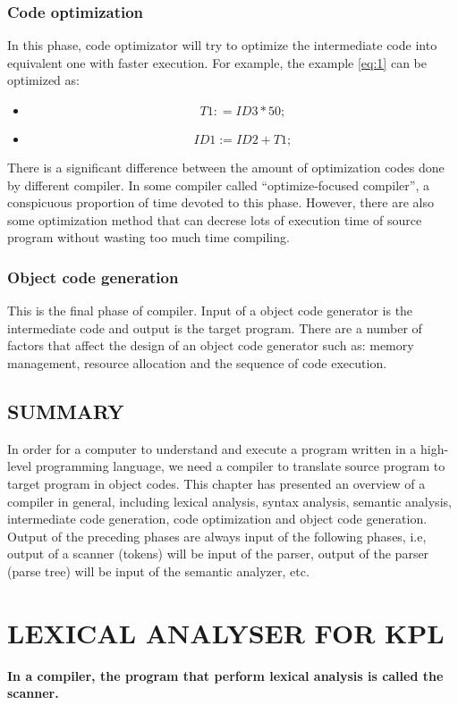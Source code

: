 \documentclass[12pt, a4paper]{report}
\begin{document}
			\subsection{Code optimization}
				\tab In this phase, code optimizator will try to optimize the intermediate code into equivalent one with faster execution. 
For example, the example \ref{eq:1} can be optimized as:
				\begin{itemize}
					\item[] $$T1: = ID3 * 50;$$
					\item[] $$ID1:= ID2 + T1;$$
				\end{itemize}
				\tab There is a significant difference between the amount of optimization codes done by different compiler. In some compiler called “optimize-focused compiler”, a conspicuous proportion of time devoted to this phase. However, there are also some optimization method that can decrese lots of execution time of source program without wasting too much time compiling.
			\subsection{Object code generation}
				\tab This is the final phase of compiler. Input of a object code generator is the intermediate code and output is the target program. There are a number of factors that affect the design of an object code generator such as: memory management, resource allocation and the sequence of code execution.
		\section{SUMMARY}
			\tab In order for a computer to understand and execute a program written in a high-level programming language, we need a compiler to translate source program to target program in object codes. This chapter has presented an overview of a compiler in general, including lexical analysis, syntax analysis,  semantic analysis, intermediate code generation, code optimization and object code generation. Output of the preceding phases are always input of the following phases, i.e, output of a scanner (tokens) will be input of the parser, output of the parser (parse tree) will be input of the semantic analyzer, etc.
	
	\chapter{LEXICAL ANALYSER FOR KPL}
	\newpage
	\large\textbf{In a compiler, the program that perform lexical analysis is called the scanner.}
	
\end{document}
